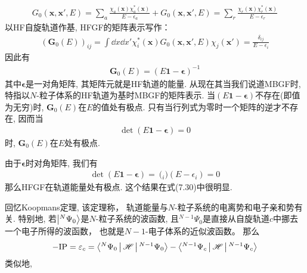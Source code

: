 \begin{align}
G_0(\mathbf{x,x'},E) = \sum_a \frac{\chi_a(\mathbf{x})\chi_a^*(\mathbf{x})}{E-\epsilon_a} + G_0(\mathbf{x,x'},E) = \sum_r \frac{\chi_r(\mathbf{x})\chi_r^*(\mathbf{x})}{E-\epsilon_r}
\end{align}
以HF自旋轨道作基, 
HFGF的矩阵表示写作：
\begin{align}\label{7.30}
(\mathbf{G}_0(E))_{ij} = \int\dd{x}\dd{x'}\chi_i^*(\mathbf{x})G_0(\mathbf{x,x'},E)\chi_j(\mathbf{x'}) = \frac{\delta_{ij}}{E - \epsilon_i}
\end{align}
因此有
\begin{align}\label{7.31}
\mathbf{G}_0(E) = (E\mathbf{1} - \bm{\epsilon})^{-1}
\end{align}
其中$\bm{\epsilon}$是一对角矩阵, 
其矩阵元就是HF轨道的能量. 
从现在其当我们说道MBGF时, 
特指以$N$-粒子体系的HF轨道为基时MBGF的矩阵表示. 
 当$(E\bm{1-\epsilon})$不存在(即值为无穷)时, 
$\mathbf{G}_0(E)$在$E$的值处有极点. 
只有当行列式为零时一个矩阵的逆才不存在, 
因而当
\begin{align*}
\det(E\bm{1-\epsilon})=0
\end{align*}
时, 
$\mathbf{G}_0(E)$在$E$处有极点.


由于$\bm{\epsilon}$时对角矩阵, 
我们有
\begin{align*}
\det(E\bm{1-\epsilon}) = \pod_i (E-\epsilon_i) = 0
\end{align*}
那么HFGF在\hft 轨道能量处有极点. 
这个结果在式(7.30)中很明显.


回忆Koopmans定理, 
该定理称，
轨道能量与$N$-粒子系统的电离势和电子亲和势有关. 
特别地, 
若$\Ket{{}^N\Psi_0}$是$N$-粒子系统的\hft 波函数, 
且${}^{N-1}\Psi_0$是直接从自旋轨道$c$中挪去一个电子所得的波函数，
也就是$N-1$-电子体系的近似波函数。
那么
\begin{align}
-\mathrm{IP} = \varepsilon_c = \Braket{{}^N\Psi_0|\mathscr{H}|{}^{N-1}\Psi_0} - \Braket{{}^{N-1}\Psi_c|\mathscr{H}|{}^{N-1}\Psi_c}
\end{align}
类似地,

